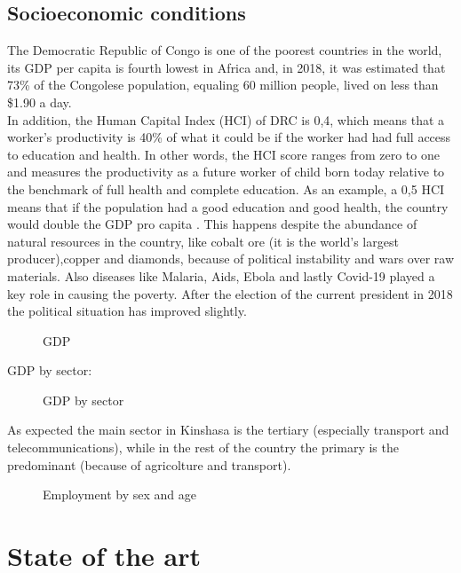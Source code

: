 \documentclass{article}
\begin{document}
\subsection{Socioeconomic conditions}
The Democratic Republic of Congo is one of the poorest countries in the world, its GDP per capita is fourth lowest in Africa \cite{gdp} and, in 2018, it was estimated that 73\% of the Congolese population, equaling 60 million people, lived on less than \$1.90 a day. \cite{poverty}\\
In addition, the Human Capital Index (HCI) of DRC is 0,4, which means that a worker’s productivity is 40\% of what it could be if the worker had had full access to education and health. In other words, the HCI score ranges from zero to one and measures the productivity as a future worker of child born today relative to the benchmark of full health and complete education. As an example, a 0,5 HCI means that if the population had a good education and good health, the country would double the GDP pro capita \cite{HCI}. This happens despite the abundance of natural resources in the country, like cobalt ore (it is the world's largest producer),copper and diamonds, because of political instability and wars over raw materials.
Also diseases like Malaria, Aids, Ebola and lastly Covid-19 played a key role in causing the poverty.
After the election of the current president in 2018 the political situation has improved slightly.
\begin{figure}[H]
\centering
{}
\qquad
{}
\caption{GDP \cite{japan}}
\end{figure}
GDP by sector:
\begin{figure}[H]
\centering
{}
\qquad
{}
\caption{GDP by sector \cite{japan}}
\end{figure}
As expected the main sector in Kinshasa is the tertiary (especially transport and telecommunications), while in the rest of the country the primary is the predominant (because of agricolture and transport).
\begin{figure}[H]
\centering
{}
\qquad
{}
\caption{Employment by sex and age \cite{japan}}
\end{figure}
\newpage
\section{State of the art}
\end{document}

